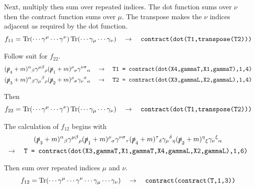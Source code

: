 \documentclass[12pt]{article}
\begin{document}
\noindent
Next, multiply then sum over repeated indices.
The dot function sums over $\nu$ then the contract function
sums over $\mu$. The transpose makes the $\nu$ indices adjacent
as required by the dot function.
$$
f_{11}=
\mathop{\rm Tr}(\cdots\gamma^\mu\cdots\gamma^\nu)
\mathop{\rm Tr}(\cdots\gamma_\mu\cdots\gamma_\nu)
\quad\rightarrow\quad
\text{\tt contract(dot(T1,transpose(T2)))}
$$

\noindent
Follow suit for $f_{22}$.
\begin{align*}
(\slashed{p}_4+m)^\alpha{}_\beta
\gamma^{\mu\beta}{}_\rho
(\slashed{p}_1+m)^\rho{}_\sigma
\gamma^{\nu\sigma}{}_\alpha
\quad&\rightarrow\quad
\text{\tt T1 = contract(dot(X4,gammaT,X1,gammaT),1,4)}
\\
(\slashed{p}_3+m)^\alpha{}_\beta
\gamma_\mu{}^\beta{}_\rho
(\slashed{p}_2+m)^\rho{}_\sigma
\gamma_\nu{}^\sigma{}_\alpha
\quad&\rightarrow\quad
\text{\tt T2 = contract(dot(X3,gammaL,X2,gammaL),1,4)}
\end{align*}

\noindent
Then
$$
f_{22}=
\mathop{\rm Tr}(\cdots\gamma^\mu\cdots\gamma^\nu)
\mathop{\rm Tr}(\cdots\gamma_\mu\cdots\gamma_\nu)
\quad\rightarrow\quad
\text{\tt contract(dot(T1,transpose(T2)))}
$$

\noindent
The calculation of $f_{12}$ begins with
\begin{multline*}
(\slashed{p}_3+m)^\alpha{}_\beta
\gamma^{\mu\beta}{}_\rho
(\slashed{p}_1+m)^\rho{}_\sigma
\gamma^{\nu\sigma}{}_\tau
(\slashed{p}_4+m)^\tau{}_\delta
\gamma_\mu{}^\delta{}_\eta
(\slashed{p}_2+m)^\eta{}_\xi
\gamma_\nu{}^\xi{}_\alpha
\\
\rightarrow\quad
\text{\tt T = contract(dot(X3,gammaT,X1,gammaT,X4,gammaL,X2,gammaL),1,6)}
\end{multline*}

\noindent
Then sum over repeated indices $\mu$ and $\nu$.
$$
f_{12}=\mathop{\rm Tr}(\cdots\gamma^\mu\cdots\gamma^\nu\cdots\gamma_\mu\cdots\gamma_\nu)
\quad\rightarrow\quad
\text{\tt contract(contract(T,1,3))}
$$
\end{document}
